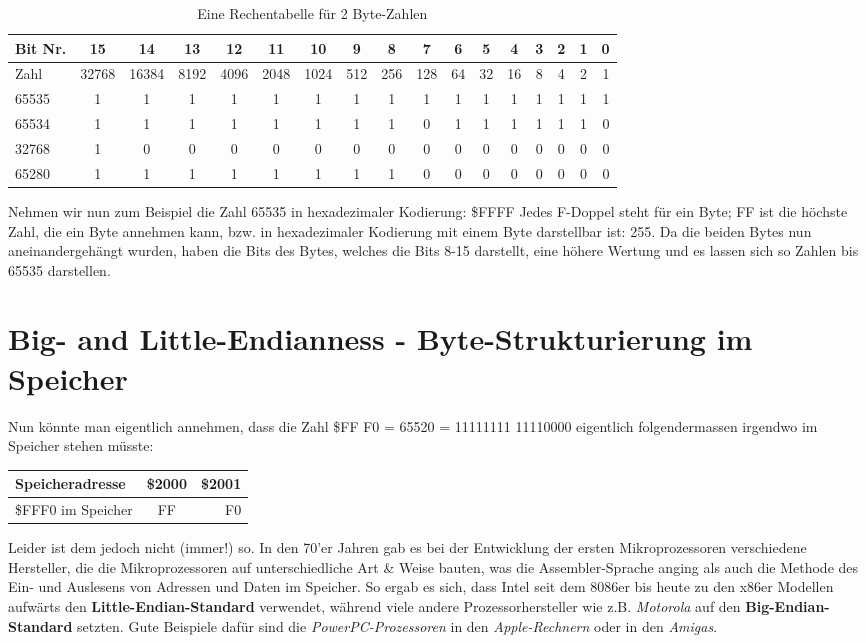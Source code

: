 \documentclass[b5paper,10pt,dvips,fleqn,titlepage,twoside]{book}
\begin{document}
\oddsidemargin -0.6in
\begin{table}[h]
\caption{Eine Rechentabelle für 2 Byte-Zahlen}
\begin{tabular}{|l|c|c|c|c|c|c|c|c|c|c|c|c|c|c|c|r|}\hline
Bit Nr. & 15 & 14 & 13 & 12 & 11 & 10 & 9 & 8 & 7 & 6 & 5 & 4 & 3 & 2 & 1 & 0\\\hline
Zahl & 32768 & 16384 & 8192 & 4096 & 2048 & 1024 & 512 & 256 & 128 & 64 & 32 & 16 & 8 & 4 & 2 & 1\\\hline\hline
65535  & 1 & 1 & 1 & 1 & 1 & 1 & 1 & 1 & 1 & 1 & 1 & 1 & 1 & 1 & 1 & 1\\\hline
65534 &1 & 1 & 1 & 1 & 1 & 1 & 1 & 1 & 0 & 1 & 1 & 1 & 1 & 1 & 1 & 0\\\hline
32768 & 1 & 0 & 0 & 0 & 0 & 0 & 0 & 0 & 0 & 0 & 0 & 0 & 0 & 0 & 0 & 0\\\hline
65280 & 1 & 1 & 1 & 1 & 1 & 1 & 1 & 1 & 0 & 0 & 0 & 0 & 0 & 0 & 0 & 0\\\hline
\end{tabular}
\end{table}

Nehmen wir nun zum Beispiel die Zahl 65535 in hexadezimaler Kodierung: \$FFFF
Jedes F-Doppel steht für ein Byte; FF ist die höchste Zahl, die ein Byte annehmen kann, bzw. in hexadezimaler Kodierung mit einem Byte darstellbar ist: 255. Da die beiden Bytes nun aneinandergehängt wurden, haben die Bits des Bytes, welches die Bits 8-15 darstellt, eine höhere Wertung und es lassen sich so Zahlen bis 65535 darstellen.
\newpage
\section{Big- and Little-Endianness - Byte-Strukturierung im Speicher}
Nun könnte man eigentlich annehmen, dass die Zahl \$FF F0 = 65520 = 11111111 11110000 eigentlich folgendermassen irgendwo im Speicher stehen müsste:\newline
\begin{center}
\begin{tabular}{|l|c|r|}\hline
Speicheradresse & \$2000 & \$2001 \\\hline
\$FFF0 im Speicher & FF & F0\\\hline
\end{tabular}
\end{center}


Leider ist dem jedoch nicht (immer!) so. In den 70'er Jahren gab es bei der Entwicklung der ersten Mikroprozessoren verschiedene Hersteller, die die Mikroprozessoren auf unterschiedliche Art \& Weise bauten, was die Assembler-Sprache anging als auch die Methode des Ein- und Auslesens von Adressen und Daten im Speicher.\newline
So ergab es sich, dass Intel seit dem 8086er bis heute zu den x86er Modellen aufwärts den \textbf{Little-Endian-Standard} verwendet, während viele andere Prozessorhersteller wie z.B. \emph{Motorola} auf den \textbf{Big-Endian-Standard} setzten. Gute Beispiele dafür sind die \emph{PowerPC-Prozessoren} in den \emph{Apple-Rechnern} oder in den \emph{Amigas}.
\end{document}
